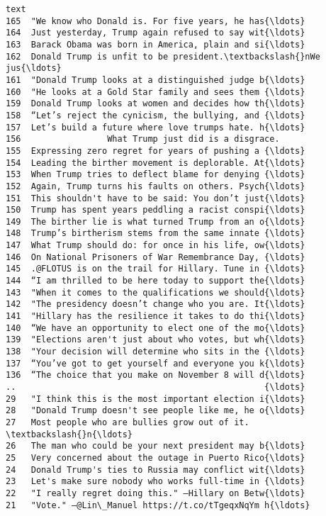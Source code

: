 \documentclass[11pt]{article}
\begin{document}
    \begin{Verbatim}[commandchars=\\\{\}]
                                                  text
165  "We know who Donald is. For five years, he has{\ldots}
164  Just yesterday, Trump again refused to say wit{\ldots}
163  Barack Obama was born in America, plain and si{\ldots}
162  Donald Trump is unfit to be president.\textbackslash{}nWe jus{\ldots}
161  "Donald Trump looks at a distinguished judge b{\ldots}
160  "He looks at a Gold Star family and sees them {\ldots}
159  Donald Trump looks at women and decides how th{\ldots}
158  “Let’s reject the cynicism, the bullying, and {\ldots}
157  Let’s build a future where love trumps hate. h{\ldots}
156                 What Trump just did is a disgrace.
155  Expressing zero regret for years of pushing a {\ldots}
154  Leading the birther movement is deplorable. At{\ldots}
153  When Trump tries to deflect blame for denying {\ldots}
152  Again, Trump turns his faults on others. Psych{\ldots}
151  This shouldn't have to be said: You don’t just{\ldots}
150  Trump has spent years peddling a racist conspi{\ldots}
149  The birther lie is what turned Trump from an o{\ldots}
148  Trump’s birtherism stems from the same innate {\ldots}
147  What Trump should do: for once in his life, ow{\ldots}
146  On National Prisoners of War Remembrance Day, {\ldots}
145  .@FLOTUS is on the trail for Hillary. Tune in {\ldots}
144  “I am thrilled to be here today to support the{\ldots}
143  "When it comes to the qualifications we should{\ldots}
142  "The presidency doesn’t change who you are. It{\ldots}
141  "Hillary has the resilience it takes to do thi{\ldots}
140  “We have an opportunity to elect one of the mo{\ldots}
139  "Elections aren't just about who votes, but wh{\ldots}
138  "Your decision will determine who sits in the {\ldots}
137  “You’ve got to get yourself and everyone you k{\ldots}
136  “The choice that you make on November 8 will d{\ldots}
..                                                 {\ldots}
29   "I think this is the most important election i{\ldots}
28   "Donald Trump doesn't see people like me, he o{\ldots}
27   Most people who are bullies grow out of it. \textbackslash{}n{\ldots}
26   The man who could be your next president may b{\ldots}
25   Very concerned about the outage in Puerto Rico{\ldots}
24   Donald Trump's ties to Russia may conflict wit{\ldots}
23   Let's make sure nobody who works full-time in {\ldots}
22   "I really regret doing this." —Hillary on Betw{\ldots}
21   "Vote." —@Lin\_Manuel https://t.co/tTgeqxNqYm h{\ldots}

\end{Verbatim}
\end{document}
